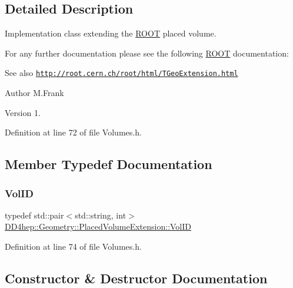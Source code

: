 \subsection{Detailed Description}
Implementation class extending the \hyperlink{namespace_r_o_o_t}{R\+O\+OT} placed volume. 

For any further documentation please see the following \hyperlink{namespace_r_o_o_t}{R\+O\+OT} documentation\+: \begin{DoxySeeAlso}{See also}
\href{http://root.cern.ch/root/html/TGeoExtension.html}{\tt http\+://root.\+cern.\+ch/root/html/\+T\+Geo\+Extension.\+html}
\end{DoxySeeAlso}
\begin{DoxyAuthor}{Author}
M.\+Frank 
\end{DoxyAuthor}
\begin{DoxyVersion}{Version}
1. 
\end{DoxyVersion}


Definition at line 72 of file Volumes.\+h.



\subsection{Member Typedef Documentation}
\hypertarget{class_d_d4hep_1_1_geometry_1_1_placed_volume_extension_a9f0e95dedfbda206b118af985b2ed473}{}\label{class_d_d4hep_1_1_geometry_1_1_placed_volume_extension_a9f0e95dedfbda206b118af985b2ed473} 
\subsubsection{\texorpdfstring{Vol\+ID}{VolID}}
{\footnotesize\ttfamily typedef std\+::pair$<$std\+::string, int$>$ \hyperlink{class_d_d4hep_1_1_geometry_1_1_placed_volume_extension_a9f0e95dedfbda206b118af985b2ed473}{D\+D4hep\+::\+Geometry\+::\+Placed\+Volume\+Extension\+::\+Vol\+ID}}



Definition at line 74 of file Volumes.\+h.



\subsection{Constructor \& Destructor Documentation}
\hypertarget{class_d_d4hep_1_1_geometry_1_1_placed_volume_extension_a1a86dc8c412bb00df13a4fb56c0958bf}{}\label{class_d_d4hep_1_1_geometry_1_1_placed_volume_extension_a1a86dc8c412bb00df13a4fb56c0958bf} 
